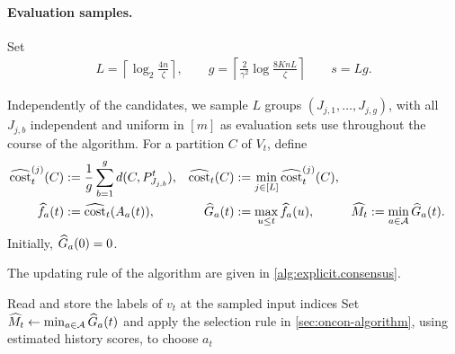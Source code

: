 \paragraph{Evaluation samples.}
Set
\begin{align}
    L=\left\lceil\log_2\frac{4n}{\zeta}\right\rceil, \qquad
    g=\left\lceil\frac{2}{\gamma^2}\log\frac{8KnL}{\zeta}\right\rceil \qquad
    s=Lg.
    \label{eq:explicit.consensus.parameters}
\end{align}

Independently of the candidates, we sample $ L $ groups $ (J_{j,1},\ldots,J_{j,g}) $, with all $ J_{j,b} $ independent and uniform in $ [m] $ as evaluation sets use throughout the course of the algorithm.
For a partition $ C $ of $ V_t $, define
\begin{align}
    \widehat{\operatorname{cost}}^{(j)}_{t}(C)&:=\frac1g\sum_{b=1}^g d(C,P_{J_{j,b}}^t),
    &\widehat{\operatorname{cost}}_{t}(C)&:=\min_{j\in[L]}\widehat{\operatorname{cost}}^{(j)}_{t}(C),\label{eq:explicit.consensus.estimates}\\
    \widehat f_{a}(t)&:=\widehat{\operatorname{cost}}_{t}(A_a(t)),
    &\widehat G_{a}(t)&:=\max_{u\le t}\widehat f_{a}(u),
    &\widehat M_{t}&:=\min_{a\in\mathcal{A}}\widehat G_{a}(t).\nonumber
\end{align}
Initially, $ \widehat G_{a}(0)=0 $.

The updating rule of the algorithm are given in \cref{alg:explicit.consensus}.


\begin{algorithm}[htbp]
    \DontPrintSemicolon
    Read and store the labels of $ v_t $ at the sampled input indices\;
    Set $ \widehat M_{t}\gets\min_{a\in\mathcal{A}}\widehat G_{a}(t) $ and apply the selection rule in \cref{sec:oncon-algorithm}, using estimated history scores, to choose $ a_t $\;
    \caption{Explicit dynamic consensus-clustering algorithm.}
    \label{alg:explicit.consensus}
\end{algorithm}

